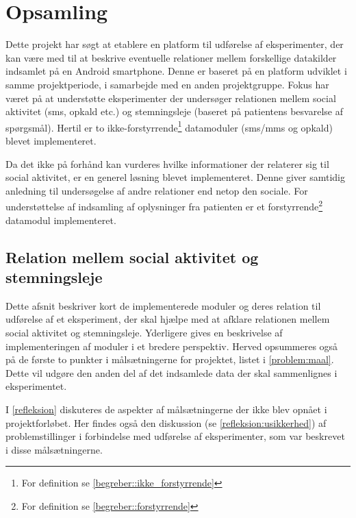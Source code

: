 \chapter{Opsamling}
Dette projekt har søgt at etablere en platform til udførelse af eksperimenter, der kan være med til at beskrive eventuelle relationer mellem forskellige datakilder indsamlet på en Android smartphone.
Denne er baseret på en platform\citefaelles{} udviklet i samme projektperiode, i samarbejde med en anden projektgruppe.
Fokus har været på at understøtte eksperimenter der undersøger relationen mellem social aktivitet (sms, opkald etc.) og stemningsleje (baseret på patientens besvarelse af spørgsmål).
Hertil er to ikke-forstyrrende\footnote{For definition se \cref{begreber::ikke_forstyrrende}} datamoduler (sms/mms og opkald) blevet implementeret.

Da det ikke på forhånd kan vurderes hvilke informationer der relaterer sig til social aktivitet, er en generel løsning blevet implementeret.
Denne giver samtidig anledning til undersøgelse af andre relationer end netop den sociale.
For understøttelse af indsamling af oplysninger fra patienten er et forstyrrende\footnote{For definition se \cref{begreber::forstyrrende}} datamodul implementeret.


\section{Relation mellem social aktivitet og stemningsleje}
Dette afsnit beskriver kort de implementerede moduler og deres relation til udførelse af et eksperiment, der skal hjælpe med at afklare relationen mellem social aktivitet og stemningsleje.
Yderligere gives en beskrivelse af implementeringen af moduler i et bredere perspektiv.
Herved opsummeres også på de første to punkter i målsætningerne for projektet, listet i \cref{problem:maal}.
Dette vil udgøre den anden del af det indsamlede data der skal sammenlignes i eksperimentet.

I \cref{refleksion} diskuteres de aspekter af målsætningerne der ikke blev opnået i projektforløbet.
Her findes også den diskussion (se \cref{refleksion:usikkerhed}) af problemstillinger i forbindelse med udførelse af eksperimenter, som var beskrevet i disse målsætningerne.

